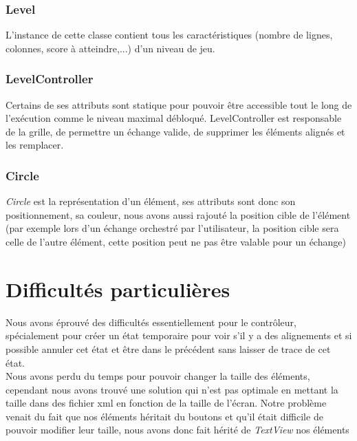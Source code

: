\subsubsection{Level}
L'instance de cette classe contient tous les caractéristiques (nombre de lignes, colonnes, score à atteindre,...) d'un niveau de jeu.
\subsubsection{LevelController}
Certains de ses attributs sont statique pour pouvoir être accessible tout le long de l'exécution comme le niveau maximal débloqué.
LevelController est responsable de la grille, de permettre un échange valide, de supprimer les éléments alignés et les remplacer.

\subsubsection{Circle}
\textit{Circle} est la représentation d'un élément, ses attributs sont donc son positionnement, sa couleur, nous avons aussi rajouté la position cible de l'élément (par exemple lors d'un échange orchestré par l'utilisateur, la position cible sera celle de l'autre élément, cette position peut ne pas être valable pour un échange) 
\section{Difficultés particulières}
Nous avons éprouvé des difficultés essentiellement pour le contrôleur, spécialement pour créer un état temporaire pour voir s'il y a des alignements et si possible annuler cet état et être dans le précédent sans laisser de trace de cet état. \\
Nous avons perdu du temps pour pouvoir changer la taille des éléments, cependant nous avons trouvé une solution qui n'est pas optimale en mettant la taille dans des fichier xml en fonction de la taille de l'écran. Notre problème venait du fait que nos éléments héritait du boutons et qu'il était difficile de pouvoir modifier leur taille, nous avons donc fait hérité de \textit{TextView} nos éléments  

